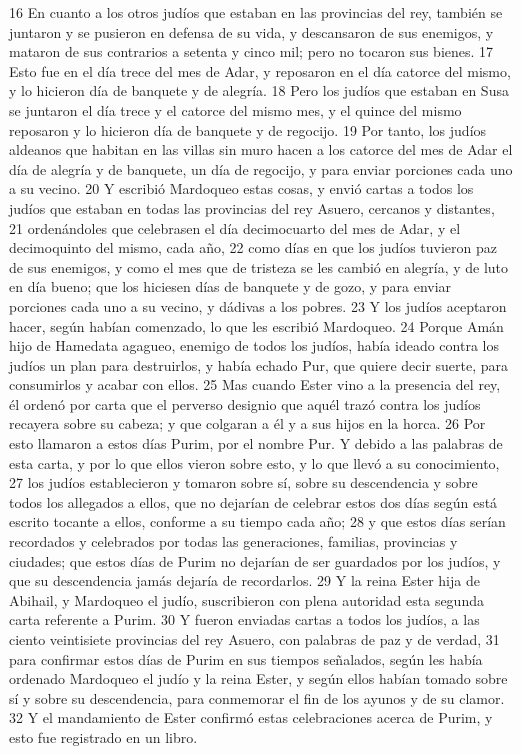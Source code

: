 16 En cuanto a los otros judíos que estaban en las provincias del rey, también se juntaron y se pusieron en defensa de su vida, y descansaron de sus enemigos, y mataron de sus contrarios a setenta y cinco mil; pero no tocaron sus bienes.
17 Esto fue en el día trece del mes de Adar, y reposaron en el día catorce del mismo, y lo hicieron día de banquete y de alegría.
18 Pero los judíos que estaban en Susa se juntaron el día trece y el catorce del mismo mes, y el quince del mismo reposaron y lo hicieron día de banquete y de regocijo.
19 Por tanto, los judíos aldeanos que habitan en las villas sin muro hacen a los catorce del mes de Adar el día de alegría y de banquete, un día de regocijo, y para enviar porciones cada uno a su vecino.
20 Y escribió Mardoqueo estas cosas, y envió cartas a todos los judíos que estaban en todas las provincias del rey Asuero, cercanos y distantes,
21 ordenándoles que celebrasen el día decimocuarto del mes de Adar, y el decimoquinto del mismo, cada año,
22 como días en que los judíos tuvieron paz de sus enemigos, y como el mes que de tristeza se les cambió en alegría, y de luto en día bueno; que los hiciesen días de banquete y de gozo, y para enviar porciones cada uno a su vecino, y dádivas a los pobres.
23 Y los judíos aceptaron hacer, según habían comenzado, lo que les escribió Mardoqueo.
24 Porque Amán hijo de Hamedata agagueo, enemigo de todos los judíos, había ideado contra los judíos un plan para destruirlos, y había echado Pur, que quiere decir suerte, para consumirlos y acabar con ellos.
25 Mas cuando Ester vino a la presencia del rey, él ordenó por carta que el perverso designio que aquél trazó contra los judíos recayera sobre su cabeza; y que colgaran a él y a sus hijos en la horca.
26 Por esto llamaron a estos días Purim, por el nombre Pur. Y debido a las palabras de esta carta, y por lo que ellos vieron sobre esto, y lo que llevó a su conocimiento,
27 los judíos establecieron y tomaron sobre sí, sobre su descendencia y sobre todos los allegados a ellos, que no dejarían de celebrar estos dos días según está escrito tocante a ellos, conforme a su tiempo cada año;
28 y que estos días serían recordados y celebrados por todas las generaciones, familias, provincias y ciudades; que estos días de Purim no dejarían de ser guardados por los judíos, y que su descendencia jamás dejaría de recordarlos.
29 Y la reina Ester hija de Abihail, y Mardoqueo el judío, suscribieron con plena autoridad esta segunda carta referente a Purim.
30 Y fueron enviadas cartas a todos los judíos, a las ciento veintisiete provincias del rey Asuero, con palabras de paz y de verdad,
31 para confirmar estos días de Purim en sus tiempos señalados, según les había ordenado Mardoqueo el judío y la reina Ester, y según ellos habían tomado sobre sí y sobre su descendencia, para conmemorar el fin de los ayunos y de su clamor.
32 Y el mandamiento de Ester confirmó estas celebraciones acerca de Purim, y esto fue registrado en un libro.

